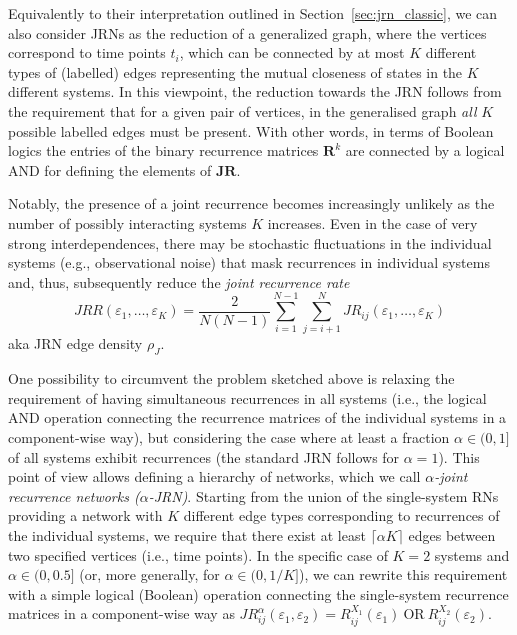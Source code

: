 Equivalently to their interpretation outlined in Section~\ref{sec:jrn_classic}, we can also consider JRNs as the reduction of a generalized graph, where the vertices correspond to time points $t_i$, which can be connected by at most $K$ different types of (labelled) edges representing the mutual closeness of states in the $K$ different systems. In this viewpoint, the reduction towards the JRN follows from the requirement that for a given pair of vertices, in the generalised graph \emph{all} $K$ possible labelled edges must be present. With other words, in terms of Boolean logics the entries of the binary recurrence matrices $\mathbf{R}^k$ are connected by a logical AND for defining the elements of $\mathbf{JR}$.

Notably, the presence of a joint recurrence becomes increasingly unlikely as the number of possibly interacting systems $K$ increases. Even in the case of very strong interdependences, there may be stochastic fluctuations in the individual systems (e.g., observational noise) that mask recurrences in individual systems and, thus, subsequently reduce the \emph{joint recurrence rate}
\begin{equation}
JRR(\varepsilon_1,\dots,\varepsilon_K) = \frac{2}{N(N-1)} \sum_{i=1}^{N-1} \sum_{j=i+1}^N JR_{ij} (\varepsilon_1,\dots,\varepsilon_K)
\end{equation}
\noindent
aka JRN edge density $\rho_J$.

One possibility to circumvent the problem sketched above is relaxing the requirement of having simultaneous recurrences in all systems (i.e., the logical AND operation connecting the recurrence matrices of the individual systems in a component-wise way), but considering the case where at least a fraction $\alpha\in(0,1]$ of all systems exhibit recurrences (the standard JRN follows for $\alpha=1$). This point of view allows defining a hierarchy of networks, which we call \textit{$\alpha$-joint recurrence networks ($\alpha$-JRN)}. Starting from the union of the single-system RNs providing a network with $K$ different edge types corresponding to recurrences of the individual systems, we require that there exist at least $\lceil\alpha K\rceil$ edges between two specified vertices (i.e., time points). In the specific case of $K=2$ systems and $\alpha\in(0,0.5]$ (or, more generally, for $\alpha\in(0,1/K]$), we can rewrite this requirement with a simple logical (Boolean) operation connecting the single-system recurrence matrices in a component-wise way as $JR^{\alpha}_{ij}(\varepsilon_1,\varepsilon_2) = R^{X_1}_{ij}(\varepsilon_1)\ \mbox{OR}\ R^{X_2}_{ij}(\varepsilon_2)$.

